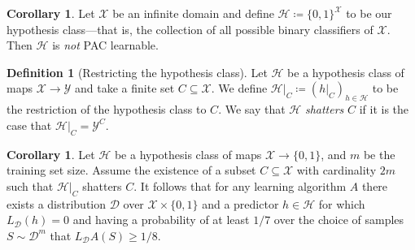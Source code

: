 \documentclass[11pt, reqno]{amsart}
\theoremstyle{definition}
\newtheorem{corollary}[theorem]{Corollary}
\newtheorem{definition}[theorem]{Definition}
\renewcommand{\leq}{\leqslant}
\renewcommand{\geq}{\geqslant}
\DeclareMathOperator{\Prob}{\mathbb{P}} %
\DeclareMathOperator{\Expect}{\mathbb{E}} %
\begin{document}

\begin{corollary}
\label{cor:full-hypothesis-class-not-pac-learnable}
Let \(\mathcal{X}\) be an infinite domain and define
\(\mathcal{H} \coloneq \{0, 1\}^{\mathcal{X}}\) to be our hypothesis class---that is, the collection of all
possible binary classifiers of \(\mathcal{X}\). Then
\(\mathcal{H}\) is \emph{not} PAC learnable.
\end{corollary}

\begin{definition}[Restricting the hypothesis class]
\label{def:restrict-hypothesis-class}
Let \(\mathcal{H}\) be a hypothesis class of maps \(\mathcal{X} \to \mathcal{Y}\) and take a finite set
\(C \subseteq \mathcal{X}\). We define \(\mathcal{H}|_C \coloneq (h|_C)_{h \in \mathcal{H}}\) to be the restriction of the
hypothesis class to \(C\). We say that \(\mathcal{H}\) \emph{shatters} \(C\) if it is the
case that \(\mathcal{H}|_C = \mathcal{Y}^{C}\).
\end{definition}

\begin{corollary}
\label{cor:shatters-2m-cannot-learn-with-train-of-size-m}
Let \(\mathcal{H}\) be a hypothesis class of maps \(\mathcal{X} \to \{0, 1\}\), and \(m\) be the
training set size. Assume the existence of a subset \(C \subseteq \mathcal{X}\) with cardinality
\(2 m\) such that \(\mathcal{H}|_C\) shatters \(C\). It follows that for any learning
algorithm \(A\) there exists a distribution \(\mathcal{D}\) over \(\mathcal{X} \times \{0, 1\}\) and a
predictor \(h \in \mathcal{H}\) for which \(L_{\mathcal{D}}(h) = 0\) and having a probability of at
least \(1/7\) over the choice of samples \(S \sim \mathcal{D}^m\) that \(L_{\mathcal{D}}A(S) \geq 1/8\).
\end{corollary}
\end{document}
